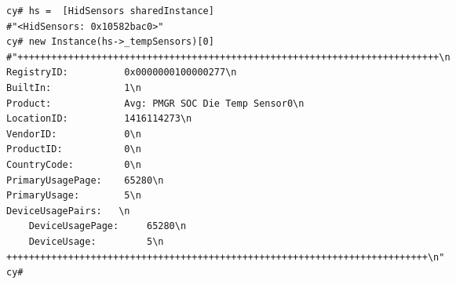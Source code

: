 \documentclass{beamer}
\begin{document}
\begin{frame}
  \begin{adjustbox}{varwidth=\maxdimen,max width=\linewidth,keepaspectratio}
    \begin{lstlisting}[basicstyle=\tiny,caption={Cycript HidSensos},label=cycript-hidsensors,breaklines]
cy# hs =  [HidSensors sharedInstance]
#"<HidSensors: 0x10582bac0>"
cy# new Instance(hs->_tempSensors)[0]
#"+++++++++++++++++++++++++++++++++++++++++++++++++++++++++++++++++++++++++++\n
RegistryID:          0x0000000100000277\n
BuiltIn:             1\n
Product:             Avg: PMGR SOC Die Temp Sensor0\n
LocationID:          1416114273\n
VendorID:            0\n
ProductID:           0\n
CountryCode:         0\n
PrimaryUsagePage:    65280\n
PrimaryUsage:        5\n
DeviceUsagePairs:   \n
    DeviceUsagePage:     65280\n
    DeviceUsage:         5\n
+++++++++++++++++++++++++++++++++++++++++++++++++++++++++++++++++++++++++++\n"
cy# 
    \end{lstlisting}
  \end{adjustbox}
\end{frame}
\end{document}
